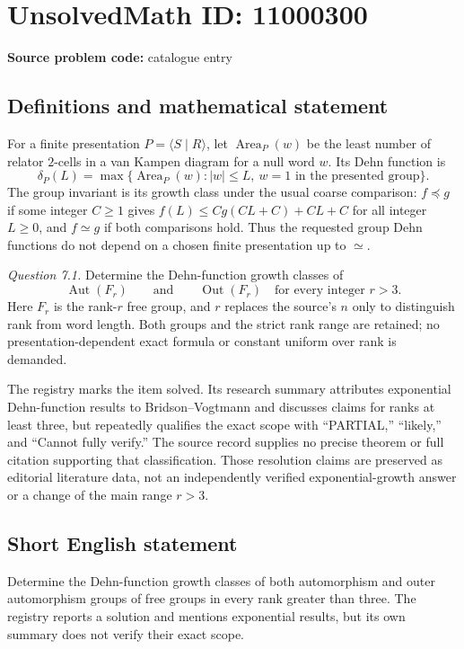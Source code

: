 \documentclass[11pt]{article}
\begin{document}
\section*{UnsolvedMath ID: 11000300}
\textbf{Source problem code:} catalogue entry
\subsection{Definitions and mathematical statement}
For a finite presentation \(P=\langle S\mid R\rangle\), let \(\operatorname{Area}_P(w)\) be the least number of relator \(2\)-cells in a van Kampen diagram for a null word \(w\). Its Dehn function is
\[
 \delta_P(L)=\max\{\operatorname{Area}_P(w):|w|\leq L,\ w=1\text{ in the presented group}\}.
\]
The group invariant is its growth class under the usual coarse comparison: \(f\preceq g\) if some integer \(C\geq1\) gives \(f(L)\leq Cg(CL+C)+CL+C\) for all integer \(L\geq0\), and \(f\simeq g\) if both comparisons hold. Thus the requested group Dehn functions do not depend on a chosen finite presentation up to \(\simeq\).

\emph{Question 7.1.} Determine the Dehn-function growth classes of
\[
 \operatorname{Aut}(F_r)\qquad\text{and}\qquad\operatorname{Out}(F_r)
 \quad\text{for every integer }r>3.
\]
Here \(F_r\) is the rank-\(r\) free group, and \(r\) replaces the source's \(n\) only to distinguish rank from word length. Both groups and the strict rank range are retained; no presentation-dependent exact formula or constant uniform over rank is demanded.

The registry marks the item solved. Its research summary attributes exponential Dehn-function results to Bridson--Vogtmann and discusses claims for ranks at least three, but repeatedly qualifies the exact scope with ``PARTIAL,'' ``likely,'' and ``Cannot fully verify.'' The source record supplies no precise theorem or full citation supporting that classification. Those resolution claims are preserved as editorial literature data, not an independently verified exponential-growth answer or a change of the main range \(r>3\).
\subsection{Short English statement}
Determine the Dehn-function growth classes of both automorphism and outer automorphism groups of free groups in every rank greater than three. The registry reports a solution and mentions exponential results, but its own summary does not verify their exact scope.
\end{document}
